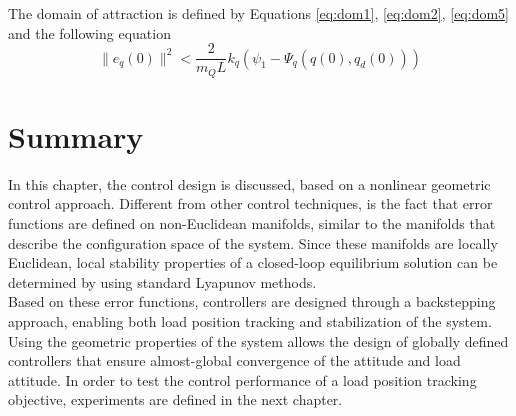The domain of attraction is defined by Equations \ref{eq:dom1}, \ref{eq:dom2}, \ref{eq:dom5} and the following equation
\begin{equation}
\parallel e_{\dot{q}}(0)\parallel^2<\frac{2}{m_QL}{k_q}(\psi_1-\Psi_q(q(0),q_d(0)))
\end{equation}

%
%
%
%
%
%
%
%
%
%
%


\section*{Summary}
In this chapter, the control design is discussed, based on a nonlinear geometric control approach.
Different from other control techniques, is the fact that error functions are defined on non-Euclidean manifolds, similar to the manifolds that describe the configuration space of the system. Since these manifolds are locally Euclidean, local stability properties of a closed-loop equilibrium solution can be determined by using standard Lyapunov methods. \\
Based on these error functions, controllers are designed through a backstepping approach, enabling both load position tracking and stabilization of the system.
Using the geometric properties of the system allows the design of globally defined controllers that ensure almost-global convergence of the  attitude and load attitude.
In order to test the control performance of a load position tracking objective, experiments are defined in the next chapter. 









